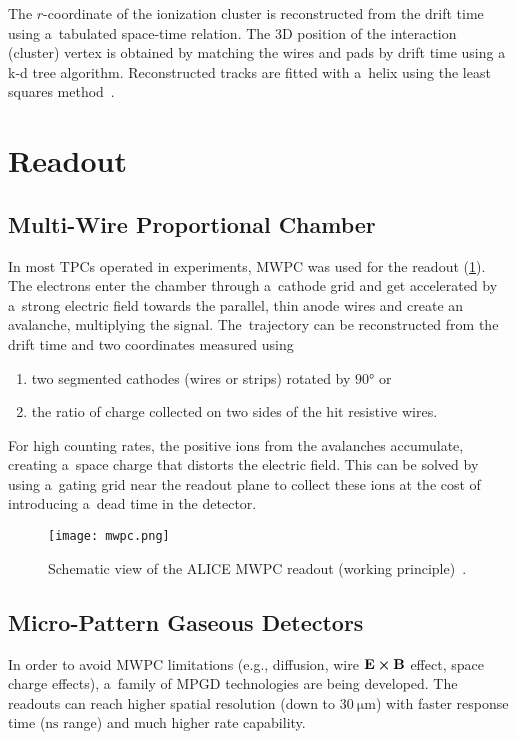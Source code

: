				The $r$\nobreakdash-coordinate of the ionization cluster is reconstructed from the drift time using a~tabulated space-time relation. The 3D position of the interaction (cluster) vertex is obtained by matching the wires and pads by drift time using a k\nobreakdash-d tree algorithm. Reconstructed tracks are fitted with a~helix using the least squares method~\cite{alpha_reco}.
	
	\section{Readout}
	\label{sec:readout}
		\subsection{Multi-Wire Proportional Chamber}
		\label{sec:MWPC}
			In most \acp{TPC} operated in experiments, \acf{MWPC} was used for the readout (\cref{fig:mwpc}). The electrons enter the chamber through a~cathode grid and get accelerated by a~strong electric field towards the parallel, thin anode wires and create an avalanche, multiplying the signal. The~trajectory can be reconstructed from the drift time and two coordinates measured using
			\begin{enumerate}[nosep,label=\alph*)]
				\item two segmented cathodes (wires or strips) rotated by $\ang{90}$ or
				\item the ratio of charge collected on two sides of the hit resistive wires.
			\end{enumerate}
			For high counting rates, the positive ions from the avalanches accumulate, creating a~space charge that distorts the electric field. This can be solved by using a~gating grid near the readout plane to collect these ions at the cost of introducing a~dead time in the detector.
			
			\begin{figure}
				\centering
				\texttt{[image: mwpc.png]}
				\caption{Schematic view of the ALICE \ac{MWPC} readout (working principle)~\cite{mwpc}.}
				\label{fig:mwpc}
			\end{figure}
			
		\subsection{Micro-Pattern Gaseous Detectors}
		\label{sec:mpgd}
			In order to avoid \ac{MWPC} limitations (e.g., diffusion, wire $\mathbf{E}\cross\mathbf{B}$ effect, space charge effects), a~family of \acf{MPGD} technologies are being developed. The readouts can reach higher spatial resolution (down to $\qty{30}{\um}$) with faster response time ($\unit{\ns}$ range) and much higher rate capability.
			
